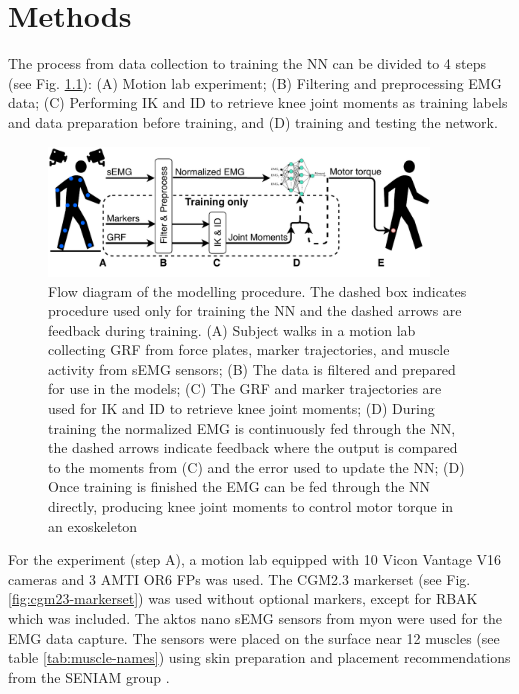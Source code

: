 \documentclass[../main.tex]{subfiles}
\begin{document}
\chapter{Methods}
\label{sec:methods}
The process from data collection to training the \ac{NN} can be divided to 4 steps (see Fig. \ref{fig:process-diagram}): (A) Motion lab experiment; (B) Filtering and preprocessing EMG data; (C) Performing \ac{IK} and \ac{ID} to retrieve knee joint moments as training labels and data preparation before training, and (D) training and testing the network.

\begin{figure}[ht]
    \centering
    \includegraphics[width=0.9\textwidth]{img/ProcessDiagram}
    \caption{Flow diagram of the modelling procedure. The dashed box indicates procedure used only for training the \ac{NN} and the dashed arrows are feedback during training. (A) Subject walks in a motion lab collecting \ac{GRF} from force plates, marker trajectories, and muscle activity from \ac{sEMG} sensors; (B) The data is filtered and prepared for use in the models; (C) The \ac{GRF} and marker trajectories are used for \ac{IK} and \ac{ID} to retrieve knee joint moments; (D) During training the normalized \ac{EMG} is continuously fed through the \ac{NN}, the dashed arrows indicate feedback where the output is compared to the moments from (C) and the error used to update the \ac{NN}; (D) Once training is finished the \ac{EMG} can be fed through the \ac{NN} directly, producing knee joint moments to control motor torque in an exoskeleton}
    \label{fig:process-diagram}
\end{figure}

For the experiment (step A), a motion lab equipped with 10 Vicon Vantage V16 cameras and 3 AMTI OR6 \acp{FP} was used. 
The CGM2.3 markerset \textcite{Leboeuf2019} (see Fig. \ref{fig:cgm23-markerset}) was used without optional markers, except for RBAK which was included.
The aktos nano \ac{sEMG} sensors from myon were used for the \ac{EMG} data capture. 
The sensors were placed on the surface near 12 muscles (see table \ref{tab:muscle-names}) using skin preparation and placement recommendations from the SENIAM group \cite{Hermens1999, Hermens2000}.
\end{document}

